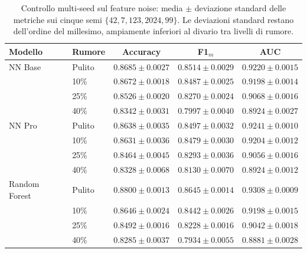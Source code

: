 \begin{table}[H]\centering\footnotesize
\caption{Controllo multi-seed sul feature noise: media $\pm$ deviazione standard delle metriche sui cinque semi $\{42, 7, 123, 2024, 99\}$. Le deviazioni standard restano dell'ordine del millesimo, ampiamente inferiori al divario tra livelli di rumore.}\label{tab:multiseed}
\begin{tabular}{ll ccc}
\toprule
Modello & Rumore & Accuracy & F1$_m$ & AUC \\
\midrule
NN Base & Pulito & $0.8685 \pm 0.0027$ & $0.8514 \pm 0.0029$ & $0.9220 \pm 0.0015$ \\
        & 10\%   & $0.8672 \pm 0.0018$ & $0.8487 \pm 0.0025$ & $0.9198 \pm 0.0014$ \\
        & 25\%   & $0.8526 \pm 0.0020$ & $0.8270 \pm 0.0024$ & $0.9068 \pm 0.0016$ \\
        & 40\%   & $0.8342 \pm 0.0031$ & $0.7997 \pm 0.0040$ & $0.8924 \pm 0.0027$ \\
\midrule
NN Pro  & Pulito & $0.8638 \pm 0.0035$ & $0.8497 \pm 0.0032$ & $0.9241 \pm 0.0010$ \\
        & 10\%   & $0.8631 \pm 0.0036$ & $0.8479 \pm 0.0030$ & $0.9204 \pm 0.0012$ \\
        & 25\%   & $0.8464 \pm 0.0045$ & $0.8293 \pm 0.0036$ & $0.9056 \pm 0.0016$ \\
        & 40\%   & $0.8328 \pm 0.0068$ & $0.8130 \pm 0.0070$ & $0.8924 \pm 0.0012$ \\
\midrule
Random Forest & Pulito & $0.8800 \pm 0.0013$ & $0.8645 \pm 0.0014$ & $0.9308 \pm 0.0009$ \\
        & 10\%   & $0.8646 \pm 0.0024$ & $0.8442 \pm 0.0026$ & $0.9198 \pm 0.0015$ \\
        & 25\%   & $0.8492 \pm 0.0016$ & $0.8228 \pm 0.0016$ & $0.9042 \pm 0.0018$ \\
        & 40\%   & $0.8285 \pm 0.0037$ & $0.7934 \pm 0.0055$ & $0.8881 \pm 0.0028$ \\
\bottomrule
\end{tabular}
\end{table}
